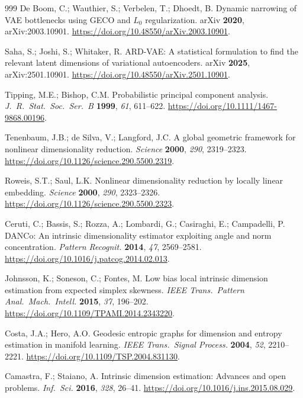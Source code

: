 \documentclass[make,article,submit,pdftex,moreauthors]{Definitions/mdpi}
\begin{document}
\begin{thebibliography}{999}
De Boom, C.; Wauthier, S.; Verbelen, T.; Dhoedt, B.
Dynamic narrowing of VAE bottlenecks using GECO and $L_0$ regularization.
arXiv \textbf{2020}, arXiv:2003.10901.
\url{https://doi.org/10.48550/arXiv.2003.10901}.

Saha, S.; Joshi, S.; Whitaker, R.
ARD-VAE: A statistical formulation to find the relevant latent dimensions
of variational autoencoders.
arXiv \textbf{2025}, arXiv:2501.10901.
\url{https://doi.org/10.48550/arXiv.2501.10901}.

Tipping, M.E.; Bishop, C.M.
Probabilistic principal component analysis.
\textit{J.\ R.\ Stat.\ Soc.\ Ser.\ B} \textbf{1999}, \textit{61}, 611--622.
\url{https://doi.org/10.1111/1467-9868.00196}.

Tenenbaum, J.B.; de Silva, V.; Langford, J.C.
A global geometric framework for nonlinear dimensionality reduction.
\textit{Science} \textbf{2000}, \textit{290}, 2319--2323.
\url{https://doi.org/10.1126/science.290.5500.2319}.

Roweis, S.T.; Saul, L.K.
Nonlinear dimensionality reduction by locally linear embedding.
\textit{Science} \textbf{2000}, \textit{290}, 2323--2326.
\url{https://doi.org/10.1126/science.290.5500.2323}.

Ceruti, C.; Bassis, S.; Rozza, A.; Lombardi, G.; Casiraghi, E.;
Campadelli, P.
DANCo: An intrinsic dimensionality estimator exploiting angle and norm
concentration.
\textit{Pattern Recognit.} \textbf{2014}, \textit{47}, 2569--2581.
\url{https://doi.org/10.1016/j.patcog.2014.02.013}.

Johnsson, K.; Soneson, C.; Fontes, M.
Low bias local intrinsic dimension estimation from expected simplex
skewness.
\textit{IEEE Trans.\ Pattern Anal.\ Mach.\ Intell.} \textbf{2015},
\textit{37}, 196--202. \url{https://doi.org/10.1109/TPAMI.2014.2343220}.

Costa, J.A.; Hero, A.O.
Geodesic entropic graphs for dimension and entropy estimation in manifold
learning.
\textit{IEEE Trans.\ Signal Process.} \textbf{2004}, \textit{52},
2210--2221. \url{https://doi.org/10.1109/TSP.2004.831130}.

Camastra, F.; Staiano, A.
Intrinsic dimension estimation: Advances and open problems.
\textit{Inf.\ Sci.} \textbf{2016}, \textit{328}, 26--41.
\url{https://doi.org/10.1016/j.ins.2015.08.029}.


\end{thebibliography}
\end{document}
